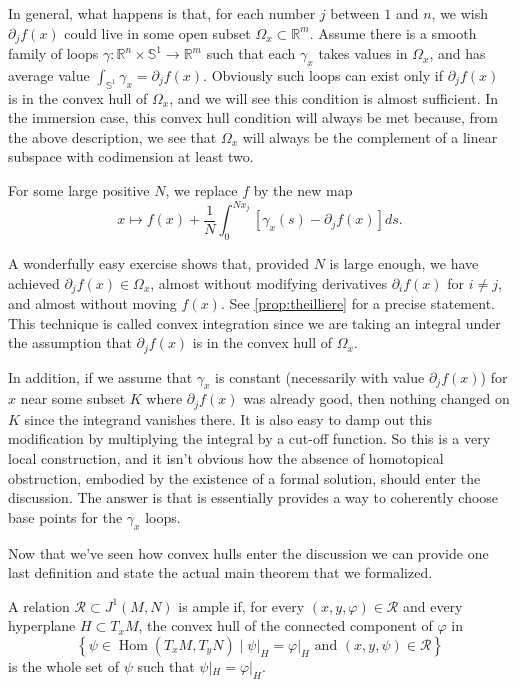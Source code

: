 \documentclass[10pt,a4paper]{article}
\newcommand{\co}{\!:}
\newcommand{\Rel}{\mathcal{R}} %
\newcommand{\rst}[2]{#1|_{#2}}
\DeclareMathOperator{\Hom}{Hom}
\begin{document}
In general, what happens is that, for each number $j$ between $1$ and
$n$, we wish $∂_jf(x)$ could live in some open subset
$Ω_x ⊂ ℝ^m$. Assume there is a smooth family of loops $γ \co ℝ^n × 𝕊^1 → ℝ^m$ such
that each $γ_x$ takes values in $Ω_x$, and has average value
$\int_{𝕊^1} γ_x = ∂_j f(x)$. Obviously such loops
can exist only if $∂_jf(x)$ is in the convex hull of $Ω_x$,
and we will see this condition is
almost sufficient. In the immersion case, this convex hull condition
will always be met because, from the above description, we see that
$Ω_x$ will always be the complement of a linear subspace with
codimension at least two.

For some large positive $N$, we replace $f$ by the new map
\[
  x ↦ f(x) + \frac1N  ∫_0^{Nx_j} \left[γ_x(s) - ∂_jf(x)\right]ds.
\]

A wonderfully easy exercise shows that, provided $N$ is large enough,
we have achieved $∂_j f(x) ∈ Ω_x$, almost without modifying
derivatives $∂_i f(x)$ for $i ≠ j$, and almost without moving
$f(x)$. See \ref{prop:theilliere} for a precise statement.
This technique is called convex integration
since we are taking an integral under the assumption that
$∂_jf(x)$ is in the convex hull of $Ω_x$.

In addition, if we assume that $γ_x$ is constant (necessarily with value
$∂_j f(x)$) for $x$ near some subset $K$ where
$∂_j f(x)$ was already good, then nothing changed on $K$ since the
integrand vanishes there. It is also easy to damp out this modification
by multiplying the integral by a cut-off function. So this is a very
local construction, and it isn't obvious how the absence of homotopical
obstruction, embodied by the existence of a formal solution, should
enter the discussion. The answer is that is essentially provides a way
to coherently choose base points for the $γ_x$ loops.

Now that we've seen how convex hulls enter the discussion we can provide one
last definition and state the actual main theorem that we formalized.

\begin{definition-intro}
  A relation $\Rel ⊂ J^1(M, N)$ is ample if, for every $(x, y, φ) ∈ \Rel$ and
  every hyperplane $H ⊂ T_xM$, the convex hull of the connected component of $φ$ in
  \[
    \left\{ψ ∈ \Hom(T_xM, T_yN) \;|\; \rst{ψ}{H} = \rst{φ}{H} \text{ and } (x, y, ψ) ∈ \Rel\right\}
  \]
  is the whole set of $ψ$ such that $\rst{ψ}{H} = \rst{φ}{H}$.
\end{definition-intro}
\end{document}
